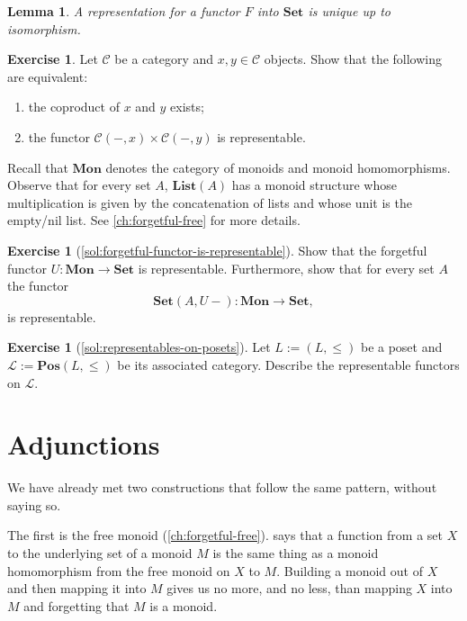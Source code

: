 \documentclass[a4paper,11pt, oneside,titlepage=false]{scrbook}
\theoremstyle{plain}
\newtheorem{lemma}[thm]{Lemma}
\theoremstyle{definition}
\newtheorem{exer}[thm]{Exercise}
\newcommand{\Cat}[1]{\mathcal{#1}}
\newcommand{\CC}{\Cat{C}}
\newcommand{\Catb}[1]{\mathbf{#1}}
\newcommand{\List}{\Catb{List}}
\newcommand{\SET}{\Catb{Set}}
\newcommand{\POS}{\Catb{Pos}}
\newcommand{\MON}{\Catb{Mon}}
\begin{document}
\begin{lemma}
A representation for a functor $F$ into $\SET$ is unique up to isomorphism.
\end{lemma}

\begin{exer}
\label{exer:coproducts-as-representable}
Let $\CC$ be a category and $x,y \in \CC$ objects.
Show that the following are equivalent:
\begin{enumerate}
\item the coproduct of $x$ and $y$ exists;
\item the functor $\CC(-,x) \times \CC(-,y)$ is representable.
\end{enumerate}
\end{exer}

Recall that $\MON$ denotes the category of monoids and monoid homomorphisms.
Observe that for every set $A$, $\List(A)$ has a monoid structure whose multiplication is given by the concatenation of lists and whose unit is the empty/nil list.
See \cref{ch:forgetful-free} for more details.
\begin{exer}[\cref{sol:forgetful-functor-is-representable}]\label{exer:forgetful-functor-is-representable}
Show that the forgetful functor $U : \MON \to \SET$ is representable.
Furthermore, show that for every set $A$ the functor
\[
\SET(A, U-) : \MON \to \SET,
\]
is representable.
\end{exer}

\begin{exer}[\cref{sol:representables-on-posets}]
\label{exer:representables-on-posets}
Let $L := (L,\leq)$ be a poset and $\mathcal{L} := \POS(L,\leq)$ be its associated category.
Describe the representable functors on $\mathcal{L}$.
\end{exer}

\chapter{Adjunctions}
\label{sec:adjunctions}

We have already met two constructions that follow the same pattern, without
saying so.

The first is the free monoid (\cref{ch:forgetful-free}).
 says that a function from a set $X$ to the
underlying set of a monoid $M$ is the same thing as a monoid homomorphism from
the free monoid on $X$ to $M$.
Building a monoid out of $X$ and then mapping it into $M$ gives us no more, and
no less, than mapping $X$ into $M$ and forgetting that $M$ is a monoid.
\end{document}
